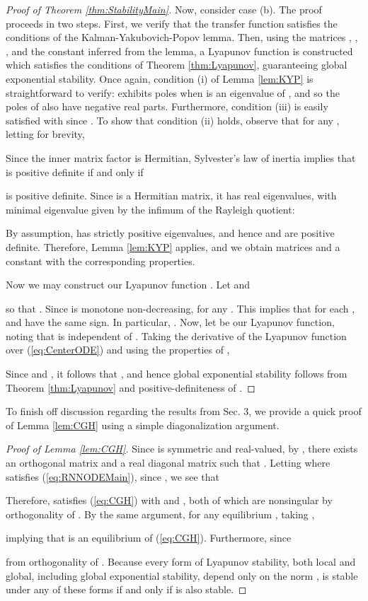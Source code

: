 \documentclass{article} \usepackage{iclr2021_conference,times}
\begin{document}
\begin{proof}[Proof of Theorem \ref{thm:StabilityMain}]
Now, consider case (b). The proof proceeds in two steps. First, we verify that the transfer function  satisfies the conditions of the Kalman-Yakubovich-Popov lemma. Then, using the matrices , , , and the constant  inferred from the lemma, a Lyapunov function is constructed which satisfies the conditions of Theorem \ref{thm:Lyapunov}, guaranteeing global exponential stability. Once again, condition (i) of Lemma \ref{lem:KYP} is straightforward to verify:  exhibits poles when  is an eigenvalue of , and so the poles of  also have negative real parts. Furthermore, condition (iii) is easily satisfied with  since . To show that condition (ii) holds, observe that for any , letting  for brevity,

Since the inner matrix factor is Hermitian, Sylvester's law of inertia implies that  is positive definite if and only if 

is positive definite. Since  is a Hermitian matrix, it has real eigenvalues, with minimal eigenvalue given by the infimum of the Rayleigh quotient:

By assumption,  has strictly positive eigenvalues, and hence  and  are positive definite. Therefore, Lemma \ref{lem:KYP} applies, and we obtain matrices  and a constant  with the corresponding properties.

Now we may construct our Lyapunov function . Let  and

so that . 
Since  is monotone non-decreasing,  for any . This implies that for each ,  and  have the same sign. In particular, . Now, let  be our Lyapunov function, noting that  is independent of . Taking the derivative of the Lyapunov function over (\ref{eq:CenterODE}) and using the properties of ,

Since  and , it follows that , and hence global exponential stability follows from Theorem \ref{thm:Lyapunov} and positive-definiteness of .
\end{proof}

To finish off discussion regarding the results from Sec. 3, we provide a quick proof of Lemma \ref{lem:CGH} using a simple diagonalization argument.

\begin{proof}[Proof of Lemma \ref{lem:CGH}]
Since  is symmetric and real-valued, by \cite[Theorem 4.1.5]{horn2012matrix}, there exists an orthogonal matrix  and a real diagonal matrix  such that . Letting  where  satisfies (\ref{eq:RNNODEMain}), since , we see that

Therefore,  satisfies (\ref{eq:CGH}) with  and , both of which are nonsingular by orthogonality of . By the same argument, for any equilibrium , taking ,

implying that  is an equilibrium of (\ref{eq:CGH}). Furthermore, since

from orthogonality of . Because every form of Lyapunov stability, both local and global, including global exponential stability, depend only on the norm  \cite[Definitions 4.4 and 4.5]{khalil2002nonlinear},  is stable under any of these forms if and only if  is also stable.
\end{proof}
\end{document}
